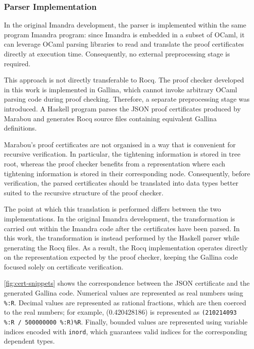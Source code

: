\subsubsection{Parser Implementation}

In the original Imandra development, the parser is implemented within the same program Imandra program: since Imandra is embedded in a subset of OCaml, it can leverage OCaml parsing libraries to read and translate the proof certificates directly at execution time. Consequently, no external preprocessing stage is required.

This approach is not directly transferable to Rocq. The proof checker developed in this work is implemented in Gallina, which cannot invoke arbitrary OCaml parsing code during proof checking. Therefore, a separate preprocessing stage was introduced. A Haskell program parses the JSON proof certificates produced by Marabou and generates Rocq source files containing equivalent Gallina definitions.

Marabou's proof certificates are not organised in a way that is convenient for recursive verification. In particular, the tightening information is stored in tree root, whereas the proof checker benefits from a representation where each tightening information is stored in their corresponding node. Consequently, before verification, the parsed certificates should be translated into data types better suited to the recursive structure of the proof checker.

The point at which this translation is performed differs between the two implementations. In the original Imandra development, the transformation is carried out within the Imandra code after the certificates have been parsed. In this work, the transformation is instead performed by the Haskell parser while generating the Rocq files. As a result, the Rocq implementation operates directly on the representation expected by the proof checker, keeping the Gallina code focused solely on certificate verification.

\autoref{fig:cert-snippets} shows the correspondence between the JSON certificate and the generated Gallina code. Numerical values are represented as real numbers using \texttt{\%:R}. Decimal values are represented as rational fractions, which are then coerced to the real numbers; for example, (0.420428186) is represented as \texttt{(210214093 \%:R / 500000000 \%:R)\%R}. Finally, bounded values are represented using variable indices encoded with \texttt{inord}, which guarantees valid indices for the corresponding dependent types.

